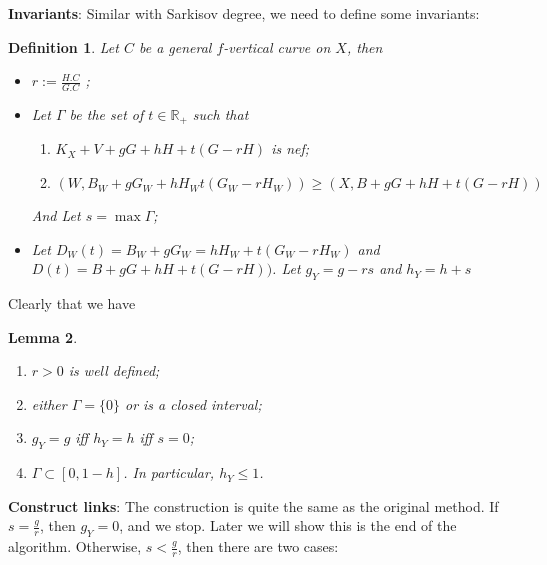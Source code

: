 \documentclass{article}
\newtheorem{defn}{Definition}[subsection]
\newtheorem{lem}[defn]{Lemma}
\begin{document}
\textbf{Invariants}: Similar with Sarkisov degree, we need to define some invariants:
\begin{defn}
  Let $C$ be a general $f$-vertical curve on $X$, then
  \begin{itemize}
    \item $r:=\frac{H.C}{G.C}$ ;
    \item Let $\Gamma$ be the set of $t\in \mathbb{R}_+$ such that 
      \begin{enumerate}
        \item $K_{X}+V+gG+hH+t(G-rH)$ is nef;
        \item $(W,B_{W}+gG_{W}+hH_{W}t(G_{W}-rH_{W}))\geqslant (X,B+gG+hH+t(G-rH))$
    \end{enumerate}
    And Let $s=\max \Gamma $;
  \item Let $D_{W}(t)=B_{W}+gG_{W}=hH_{W}+t(G_{W}-rH_{W})$ and $D(t)=B+gG+hH+t(G-rH))$. Let $g_Y=g-rs$ and $h_{Y}=h+s$
  \end{itemize}
\end{defn}
Clearly that we have 
\begin{lem}
  \begin{enumerate}
    \item $r>0$ is well defined;
    \item either $\Gamma=\{0\} $ or is a closed interval;
    \item $g_{Y}=g$ iff $h_{Y}=h$ iff $s=0$;
    \item $\Gamma \subset [0,1-h]$. In particular, $h_{Y}\leqslant 1$.
\end{enumerate}
\end{lem}
\textbf{Construct links}: The construction is quite the same as the original method. If $s=\frac{g}{r}$, then $g_{Y}=0$, and we stop. Later we will show this is the end of the algorithm. Otherwise, $s<\frac{g}{r}$, then there are two cases:
\end{document}
